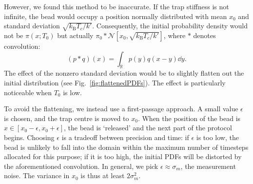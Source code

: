 \documentclass[hyperref={colorlinks=true, urlcolor=blue, citecolor=blue, final, bound}]{sfuthesis}
\newcommand{\kB}{k_{\mathrm{B}}}
\begin{document}
However, we found this method to be inaccurate. If the trap stiffness is not infinite, the bead would occupy a position normally distributed with mean $x_0$ and standard deviation $\sqrt{\kB T_c/k'}$. Consequently, the initial probability density would not be $\pi(x; T_0)$ but actually $\pi_0*\mathcal N[x_0, \sqrt{\kB T_c/k'}]$, where $*$ denotes convolution:
\begin{equation}
    (p*q)(x) = \int_{\mathbb R} p(y)q(x-y)\dd{y}.
\end{equation}
The effect of the nonzero standard deviation would be to slightly flatten out the initial distribution (see Fig.~\ref{fig:flattenedPDFs}). The effect is particularly noticeable when $T_0$ is low.

To avoid the flattening, we instead use a first-passage approach. A small value $\epsilon$ is chosen, and the trap centre is moved to $x_0$. When the position of the bead is $x \in [x_0-\epsilon, x_0+\epsilon]$, the bead is `released' and the next part of the protocol begins. Choosing $\epsilon$ is a tradeoff between precision and time: if $\epsilon$ is too low, the bead is unlikely to fall into the domain within the maximum number of timesteps allocated for this purpose; if it is too high, the initial PDFs will be distorted by the aforementioned convolution. In general, we pick $\epsilon \approx \sigma_m$, the measurement noise. The variance in $x_0$ is thus at least $2\sigma_m^2$.
\end{document}
